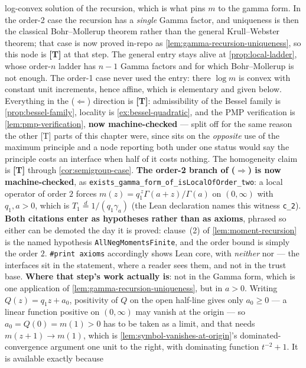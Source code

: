 \begin{theorem}
{log-convex solution of the recursion, which is what pins $m$ to the gamma form. In the order-2
case the recursion has a \emph{single} Gamma factor, and uniqueness is then the classical
Bohr--Mollerup theorem rather than the general Krull--Webster theorem; that case is now proved
in-repo as \ref{lem:gamma-recursion-uniqueness}, so this node is \textbf{[T]} at that step. The
general entry stays alive at \ref{prop:local-ladder}, whose order-$n$ ladder has $n-1$ Gamma
factors and for which Bohr--Mollerup is not enough. The order-1 case never used the entry:
there $\log m$ is convex with constant unit increments, hence affine, which is elementary and
given below. Everything in the ($\Leftarrow$) direction is \textbf{[T]}: admissibility of the
Bessel family is \ref{prop:bessel-family}, locality is \ref{ex:bessel-quadratic}, and the PMP
verification is \ref{lem:pmp-verification}, \textbf{now machine-checked} --- split off for the
same reason the other [T] parts of this chapter were, since  sits on the
\emph{opposite} use of the maximum principle and a node reporting both under one status would say
the principle costs an interface when half of it costs nothing. The homogeneity claim is
\textbf{[T]} through \ref{cor:semigroup-case}.
\textbf{The order-2 branch of ($\Rightarrow$) is now machine-checked}, as
\texttt{exists\_gamma\_form\_of\_isLocalOfOrder\_two}: a local operator of order $2$ forces
$m(z) = q_1^{\,z}\Gamma(a+z)/\Gamma(a)$ on $(0,\infty)$ with $q_1, a > 0$, which is
$T_1 \stackrel{d}{=} 1/(q_1\gamma_a)$ (the Lean declaration names this witness \texttt{c\_2}).
\textbf{Both citations enter as hypotheses rather than as
axioms}, phrased so either can be demoted the day it is proved: clause~(2) of
\ref{lem:moment-recursion} is the named hypothesis \texttt{AllNegMomentsFinite}, and the order
bound is simply the order $2$. \texttt{\#print axioms} accordingly shows Lean core, with \emph{neither}
 nor  --- the interfaces sit in the statement, where a reader sees them,
and not in the trust base.
\textbf{Where that step's work actually is}: not in the Gamma form, which is one application of
\ref{lem:gamma-recursion-uniqueness}, but in $a > 0$. Writing $Q(z) = q_1 z + a_0$, positivity of
$Q$ on the open half-line gives only $a_0 \ge 0$ --- a linear function positive on $(0,\infty)$
may vanish at the origin --- so $a_0 = Q(0) = m(1) > 0$ has to be taken as a limit, and that needs
$m(z+1) \to m(1)$, which is \ref{lem:symbol-vanishes-at-origin}'s dominated-convergence argument
one unit to the right, with dominating function $t^{-2}+1$. It is available exactly because
}
\end{theorem}
